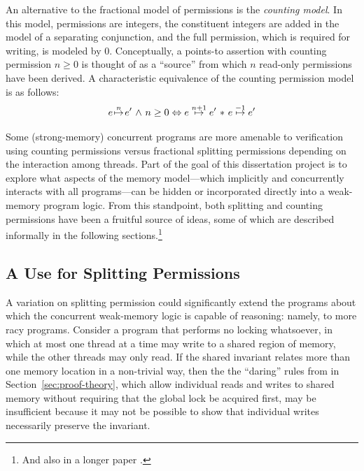 \documentclass[11pt]{report}         %
\begin{document}
An alternative to the fractional model of permissions is the \emph{counting model}. In this model, permissions are integers, the constituent integers are added in the model of a separating conjunction, and the full permission, which is required for writing, is modeled by 0. Conceptually, a points-to assertion with counting permission $n \geq 0$ is thought of as a ``source'' from which $n$ read-only permissions have been derived. A characteristic equivalence of the counting permission model is as follows: \[ e \stackrel{n}{\!\mapsto\!} e' \operatorname{\,\wedge\,} n \geq 0 \Leftrightarrow e \stackrel{n+1}{\!\mapsto\!} e' \operatorname{\,\ast\,} e \stackrel{-1}{\!\mapsto\!} e'\] 

Some (strong-memory) concurrent programs are more amenable to verification using counting permissions versus fractional splitting permissions depending on the interaction among threads. Part of the goal of this dissertation project is to explore what aspects of the memory model---which implicitly and concurrently interacts with all programs---can be hidden or incorporated directly into a weak-memory program logic. From this standpoint, both splitting and counting permissions have been a fruitful source of ideas, some of which are described informally in the following sections.\footnote{And also in a longer paper \cite{lola11}.}


\subsection{A Use for Splitting Permissions}

A variation on splitting permission could significantly extend the programs about which the concurrent weak-memory logic is capable of reasoning: namely, to more racy programs. Consider a program that performs no locking whatsoever, in which at most one thread at a time may write to a shared region of memory, while the other threads may only read. If the shared invariant relates more than one memory location in a non-trivial way, then the the ``daring'' rules from in Section~\ref{sec:proof-theory}, which allow individual reads and writes to shared memory without requiring that the global lock be acquired first, may be insufficient because it may not be possible to show that individual writes necessarily preserve the invariant.
\end{document}
